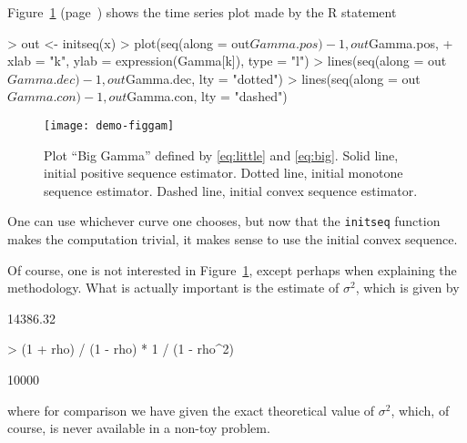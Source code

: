 \documentclass{article}
\begin{document}
Figure~\ref{fig:gamma} (page~\pageref{fig:gamma})
shows the time series plot made by the R statement
\begin{Schunk}
\begin{Sinput}
> out <- initseq(x)
> plot(seq(along = out$Gamma.pos) - 1, out$Gamma.pos,
+         xlab = "k", ylab = expression(Gamma[k]), type = "l")
> lines(seq(along = out$Gamma.dec) - 1, out$Gamma.dec, lty = "dotted")
> lines(seq(along = out$Gamma.con) - 1, out$Gamma.con, lty = "dashed")
\end{Sinput}
\end{Schunk}
\begin{figure}
\begin{center}
\texttt{[image: demo-figgam]}
\end{center}
\caption{Plot ``Big Gamma'' defined by \eqref{eq:little} and \eqref{eq:big}.
Solid line, initial positive sequence estimator.
Dotted line, initial monotone sequence estimator.
Dashed line, initial convex sequence estimator.}
\label{fig:gamma}
\end{figure}
One can use whichever curve one chooses, but now that
the \texttt{initseq} function makes the computation trivial, it makes
sense to use the initial convex sequence.

Of course, one is not interested in Figure~\ref{fig:gamma}, except
perhaps when explaining the methodology.  What is actually important
is the estimate of $\sigma^2$, which is given by
\begin{Schunk}
\begin{Soutput}
[1] 14386.32
\end{Soutput}
\begin{Sinput}
> (1 + rho) / (1 - rho) * 1 / (1 - rho^2)
\end{Sinput}
\begin{Soutput}
[1] 10000
\end{Soutput}
\end{Schunk}
where for comparison we have given the exact theoretical value of $\sigma^2$,
which, of course, is never available in a non-toy problem.
\end{document}
